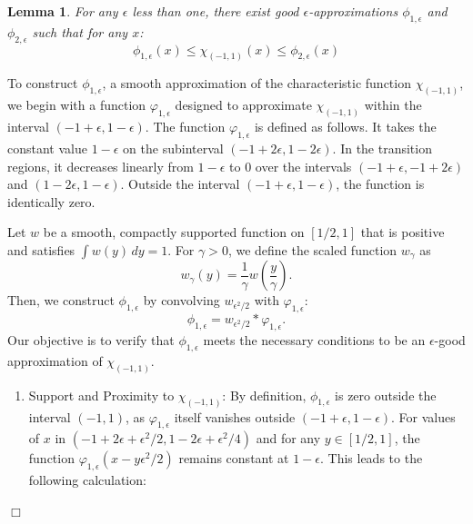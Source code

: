 \documentclass{article}
\newtheorem{lemma}[theorem]{Lemma}
\newenvironment{proof}{\noindent {\bf Proof:}}{$\Box$ \vspace{2 ex}}
\begin{document}
\begin{lemma}
    For any $\epsilon$ less than one, there exist \textit{good $\epsilon$-approximations} $\phi_{1,\epsilon}$ and $\phi_{2,\epsilon}$ such that for any $x$:
    \begin{equation*}
        \phi_{1,\epsilon}(x) \leq \chi_{(-1,1)}(x) \leq \phi_{2,\epsilon}(x)
    \end{equation*}
\end{lemma}
\begin{proof}  
To construct $\phi_{1, \epsilon}$, a smooth approximation of the characteristic function $\chi_{(-1,1)}$, we begin with a function $\varphi_{1, \epsilon}$ designed to approximate $\chi_{(-1,1)}$ within the interval $(-1+\epsilon, 1-\epsilon)$. The function $\varphi_{1, \epsilon}$ is defined as follows. It takes the constant value $1 - \epsilon$ on the subinterval $(-1 + 2\epsilon, 1 - 2\epsilon)$. In the transition regions, it decreases linearly from $1 - \epsilon$ to $0$ over the intervals $(-1 + \epsilon, -1 + 2\epsilon)$ and $(1 - 2\epsilon, 1 - \epsilon)$. Outside the interval $(-1 + \epsilon, 1 - \epsilon)$, the function is identically zero.


Let $w$ be a smooth, compactly supported function on $[1/2, 1]$ that is positive and satisfies $\int w(y) \, dy = 1$. For $\gamma > 0$, we define the scaled function $w_{\gamma}$ as
\begin{equation*}
w_{\gamma}(y) = \frac{1}{\gamma} w\left(\frac{y}{\gamma}\right).
\end{equation*}
Then, we construct $\phi_{1, \epsilon}$ by convolving $w_{\epsilon^2 / 2}$ with $\varphi_{1, \epsilon}$:
\begin{equation*}
\phi_{1, \epsilon} = w_{\epsilon^2 / 2} * \varphi_{1, \epsilon}.
\end{equation*}
Our objective is to verify that $\phi_{1, \epsilon}$ meets the necessary conditions to be an $\epsilon$-good approximation of $\chi_{(-1,1)}$.
\begin{enumerate}
    \item  Support and Proximity to $\chi_{(-1,1)}$: By definition, $\phi_{1, \epsilon}$ is zero outside the interval $(-1, 1)$, as $\varphi_{1, \epsilon}$ itself vanishes outside $(-1 + \epsilon, 1 - \epsilon)$. For values of $x$ in $(-1 + 2\epsilon + \epsilon^2 / 2, 1 - 2\epsilon + \epsilon^2 / 4)$ and for any $y \in [1/2, 1]$, the function $\varphi_{1, \epsilon}(x - y \epsilon^2 / 2)$ remains constant at $1 - \epsilon$. This leads to the following calculation:


\end{enumerate}
\end{proof}
\end{document}
